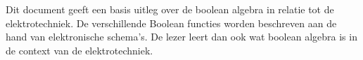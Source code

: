 Dit document geeft een basis uitleg over de boolean algebra in relatie tot de elektrotechniek. De verschillende Boolean functies worden beschreven aan de hand van elektronische schema's. De lezer leert dan ook wat boolean algebra is in de context van de elektrotechniek.

